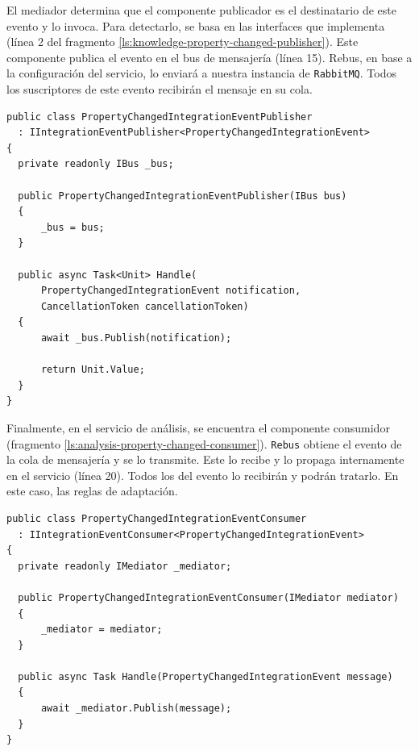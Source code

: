 
El mediador determina que el componente publicador es el destinatario de este evento y lo invoca. Para detectarlo, se basa en las interfaces que implementa (línea 2 del fragmento \ref{ls:knowledge-property-changed-publisher}). Este componente publica el evento en el bus de mensajería (línea 15). Rebus, en base a la configuración del servicio, lo enviará a nuestra instancia de \texttt{RabbitMQ}. Todos los suscriptores de este evento recibirán el mensaje en su cola.

\begin{lstlisting}[caption={El publicador de eventos captura el evento de integración y lo publica en el bus.\protect\footnotemark},captionpos=b, label=ls:knowledge-property-changed-publisher]
public class PropertyChangedIntegrationEventPublisher
  : IIntegrationEventPublisher<PropertyChangedIntegrationEvent>
{
  private readonly IBus _bus;

  public PropertyChangedIntegrationEventPublisher(IBus bus)
  {
      _bus = bus;
  }

  public async Task<Unit> Handle(
      PropertyChangedIntegrationEvent notification,
      CancellationToken cancellationToken)
  {
      await _bus.Publish(notification);

      return Unit.Value;
  }
}
\end{lstlisting}


Finalmente, en el servicio de análisis, se encuentra el componente consumidor (fragmento \ref{ls:analysis-property-changed-consumer}). \texttt{Rebus} obtiene el evento de la cola de mensajería y se lo transmite. Este lo recibe y lo propaga internamente en el servicio (línea 20). Todos los  del evento lo recibirán y podrán tratarlo. En este caso, las reglas de adaptación.

\begin{lstlisting}[caption={El consumidor recibe el evento de integración del bus y lo propaga internamente. Todos los \foreign{english}{handlers} de este evento lo recibirán.\protect\footnotemark},captionpos=b, label=ls:analysis-property-changed-consumer]
public class PropertyChangedIntegrationEventConsumer
  : IIntegrationEventConsumer<PropertyChangedIntegrationEvent>
{
  private readonly IMediator _mediator;

  public PropertyChangedIntegrationEventConsumer(IMediator mediator)
  {
      _mediator = mediator;
  }

  public async Task Handle(PropertyChangedIntegrationEvent message)
  {
      await _mediator.Publish(message);
  }
}
\end{lstlisting}

